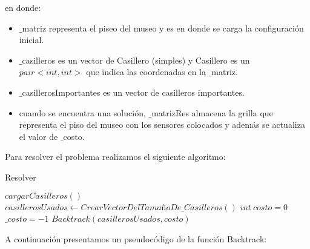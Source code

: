 en donde:

\begin{itemize}
	\item  $\_$matriz representa el piseo del museo y es en donde se carga la configuración inicial.
	\item $\_$casilleros es un vector de Casillero (simples) y Casillero es un $pair<int,int>$ que indica las coordenadas en la $\_$matriz.
	\item $\_$casillerosImportantes es un vector de casilleros importantes.
	\item cuando se encuentra una solución, $\_$matrizRes almacena la grilla que representa el piso del museo con los sensores colocados y además se actualiza el valor de $\_$costo. 
\end{itemize}

Para resolver el problema realizamos el siguiente algoritmo:

\begin{algorithm}
\caption{Resolver}\label{Resolver}
\begin{algorithmic}[1]
	\State $cargarCasilleros()$ 
	\State $casillerosUsados\gets CrearVectorDelTamañoDe\_Casilleros()$ 
	\State $int \ costo=0$ 
	\State $\_costo=-1$ 
	\State $Backtrack(casillerosUsados,costo)$
\EndProcedure
\end{algorithmic}
\end{algorithm}

A continuación presentamos un pseudocódigo de la función Backtrack:

